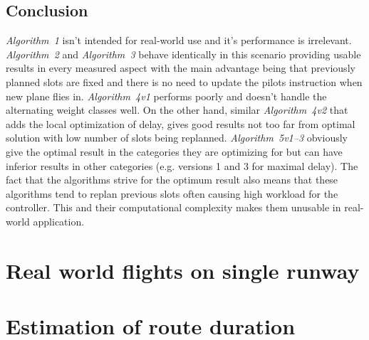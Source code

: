 \subsection{Conclusion}

{\em Algorithm~1} isn't intended for real-world use and it's performance is irrelevant. {\em Algorithm~2} and {\em Algorithm~3} behave identically in this scenario providing usable results in every measured aspect with the main advantage being that previously planned slots are fixed and there is no need to update the pilots instruction when new plane flies in. {\em Algorithm~4v1} performs poorly and doesn't handle the alternating weight classes well. On the other hand, similar {\em Algorithm~4v2} that adds the local optimization of delay, gives good results not too far from optimal solution with low number of slots being replanned. {\em Algorithm~5v1–3} obviously give the optimal result in the categories they are optimizing for but can have inferior results in other categories (e.g. versions 1 and 3 for maximal delay). The fact that the algorithms strive for the optimum result also means that these algorithms tend to replan previous slots often causing high workload for the controller. This and their computational complexity makes them unusable in real-world application.

\section{Real world flights on single runway}


\section{Estimation of route duration}


